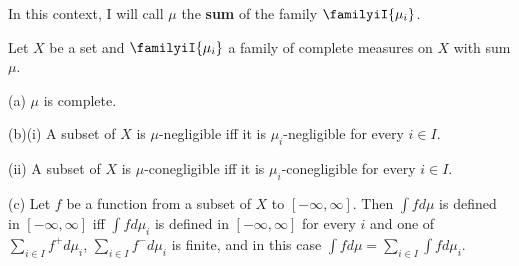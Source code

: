 \medskip

 In this context, I will call $\mu$ the {\bf sum} of
the family $\familyiI{\mu_i}$.

 Let $X$ be a set and $\familyiI{\mu_i}$ a family
of complete measures on $X$ with sum $\mu$.

(a) $\mu$ is complete.

(b)(i) A subset of $X$ is $\mu$-negligible iff it is $\mu_i$-negligible for
every $i\in I$.

\quad(ii) A subset of $X$ is $\mu$-conegligible iff it is
$\mu_i$-conegligible for every $i\in I$.

(c)
 Let $f$ be a function from a subset of $X$ to $[-\infty,\infty]$.
Then $\int fd\mu$ is defined in $[-\infty,\infty]$ iff $\int fd\mu_i$ is
defined in $[-\infty,\infty]$ for every $i$ and one of
$\sum_{i\in I}f^+d\mu_i$, $\sum_{i\in I}f^-d\mu_i$ is finite, and in this
case $\int fd\mu=\sum_{i\in I}\int fd\mu_i$.

